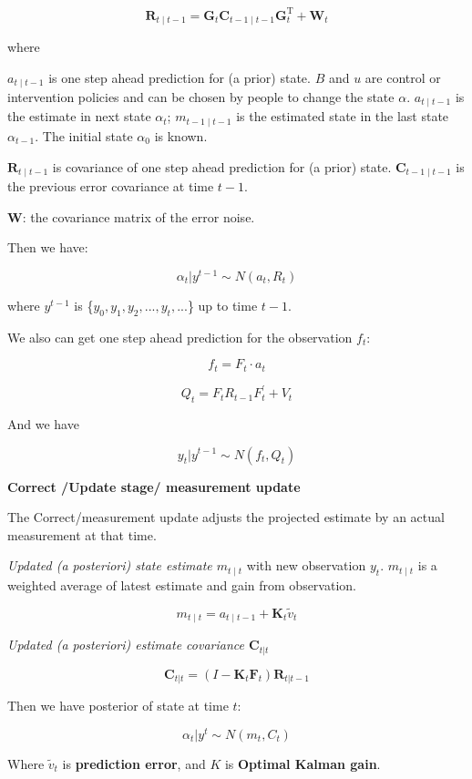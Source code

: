 $$\mathbf{R}_{t\mid t-1} = \mathbf{G}_{t} \mathbf{C}_{t-1\mid t-1} \mathbf{G}_{t}^{\text{T}} + \mathbf{W}_{t}$$




where

${a}_{t\mid t-1}$ is one step ahead prediction for (a prior) state.  $B$ and $u$ are control or intervention policies and can be chosen by people to change the state $\alpha$. ${a}_{t\mid t-1}$ is the estimate in next state $\alpha_{t}$; ${m}_{t-1\mid t-1}$ is the estimated state in the last state $\alpha_{t-1}$. The initial state $\alpha_0$ is known.    


$\mathbf{R}_{t\mid t-1}$ is covariance of one step ahead prediction for (a prior) state. $\mathbf{C}_{t-1\mid t-1}$ is the previous error covariance at time $t-1$.  

$\mathbf{W}$: the covariance matrix of the error noise.

Then we have:

$$\alpha_t|y^{t-1} \sim N(a_t, R_t)$$

where $y^{t-1}$ is \{${y_0, y_1, y_2,..., y_t,...}$\} up to time $t-1$. 

We also can get one step ahead prediction for the observation $f_t$: 

$$f_t = F_t \cdot a_t$$

$$Q_t = F_t R_{t-1} F_t^\prime + V_t$$

And we have 

$$y_t|y^{t-1} \sim N(f_t, Q_t)$$

\textbf{Correct /Update stage/  measurement update}

The Correct/measurement update adjusts the projected estimate by an actual measurement at that time.


\textit{Updated (a posteriori) state estimate $m_{t\mid t}$} with new observation $y_t$. $m_{t\mid t}$ is a weighted average of latest estimate and gain from observation. 


$$m_{t\mid t} = a_{t\mid t-1} + \mathbf{K}_t \tilde{v}_t$$  


\textit{Updated (a posteriori) estimate covariance $\mathbf{C}_{t|t}$} 



$$\mathbf{C}_{t|t} = (I - \mathbf{K}_t \mathbf{F}_t) \mathbf{R}_{t|t-1}$$


Then we have posterior of state at time $t$:

$$\alpha_t|y^t \sim N(m_t, C_t)$$


Where $\tilde{v}_t$  is \textbf{prediction error}, and $K$ is \textbf{Optimal Kalman gain}. 

